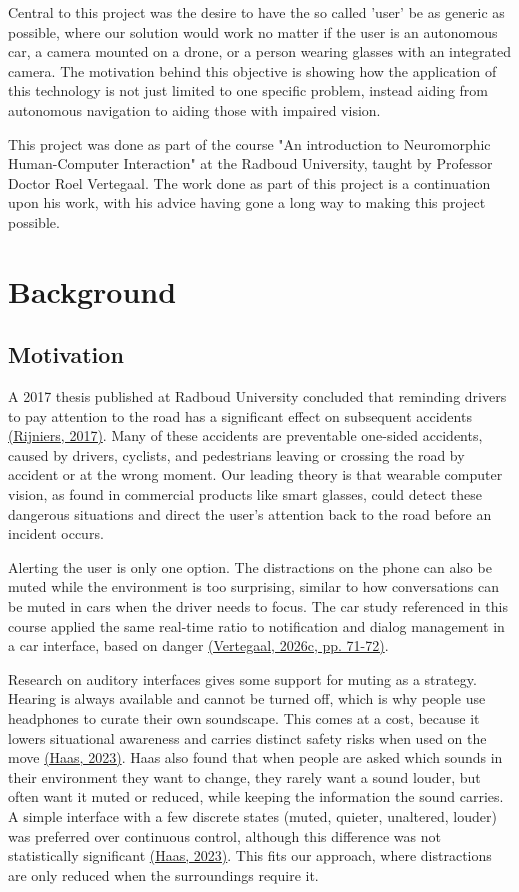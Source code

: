 \documentclass[a4paper]{article}
\begin{document}
Central to this project was the desire to have the so called 'user' be as generic as possible, where our solution would work no matter if the user is an autonomous car, a camera mounted on a drone, or a person wearing glasses with an integrated camera. The motivation behind this objective is showing how the application of this technology is not just limited to one specific problem, instead aiding from autonomous navigation to aiding those with impaired vision.

This project was done as part of the course "An introduction to Neuromorphic Human-Computer Interaction" at the Radboud University, taught by Professor Doctor Roel Vertegaal. The work done as part of this project is a continuation upon his work, with his advice having gone a long way to making this project possible.

\section{Background} \label{background}
\subsection{Motivation} \label{motivation}

A 2017 thesis published at Radboud University concluded that reminding drivers to pay attention to the road has a significant effect on subsequent accidents \hyperref[references]{(Rijniers, 2017)}. Many of these accidents are preventable one-sided accidents, caused by drivers, cyclists, and pedestrians leaving or crossing the road by accident or at the wrong moment. Our leading theory is that wearable computer vision, as found in commercial products like smart glasses, could detect these dangerous situations and direct the user's attention back to the road before an incident occurs.

Alerting the user is only one option. The distractions on the phone can also be muted while the environment is too surprising, similar to how conversations can be muted in cars when the driver needs to focus. The car study referenced in this course applied the same real-time ratio to notification and dialog management in a car interface, based on danger \hyperref[references]{(Vertegaal, 2026c, pp. 71-72)}.

Research on auditory interfaces gives some support for muting as a strategy. Hearing is always available and cannot be turned off, which is why people use headphones to curate their own soundscape. This comes at a cost, because it lowers situational awareness and carries distinct safety risks when used on the move \hyperref[references]{(Haas, 2023)}. Haas also found that when people are asked which sounds in their environment they want to change, they rarely want a sound louder, but often want it muted or reduced, while keeping the information the sound carries. A simple interface with a few discrete states (muted, quieter, unaltered, louder) was preferred over continuous control, although this difference was not statistically significant \hyperref[references]{(Haas, 2023)}. This fits our approach, where distractions are only reduced when the surroundings require it.
\end{document}
